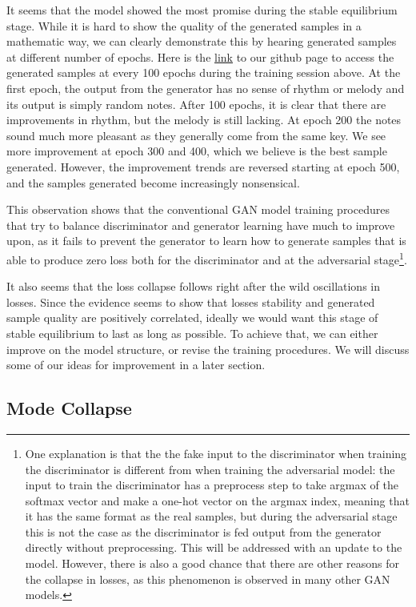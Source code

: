 \documentclass[12pt,oneside]{chicagocapstone}
\begin{document}
It seems that the model showed the most promise during the stable equilibrium stage. While it is hard to show the quality of the generated samples in a mathematic way, we can clearly demonstrate this by hearing generated samples at different number of epochs. Here is the \href{https://github.com/terrywang15/museG_dev/tree/master/2020-01-31\%2002-20}{link} to our github page to access the generated samples at every 100 epochs during the training session above. At the first epoch, the output from the generator has no sense of rhythm or melody and its output is simply random notes. After 100 epochs, it is clear that there are improvements in rhythm, but the melody is still lacking. At epoch 200 the notes sound much more pleasant as they generally come from the same key. We see more improvement at epoch 300 and 400, which we believe is the best sample generated. However, the improvement trends are reversed starting at epoch 500, and the samples generated become increasingly nonsensical.

This observation shows that the conventional GAN model training procedures that try to balance discriminator and generator learning have much to improve upon, as it fails to prevent the generator to learn how to generate samples that is able to produce zero loss both for the discriminator and at the adversarial stage\footnote{One explanation is that the the fake input to the discriminator when training the discriminator is different from when training the adversarial model: the input to train the discriminator has a preprocess step to take argmax of the softmax vector and make a one-hot vector on the argmax index, meaning that it has the same format as the real samples, but during the adversarial stage this is not the case as the discriminator is fed output from the generator directly without preprocessing. This will be addressed with an update to the model. However, there is also a good chance that there are other reasons for the collapse in losses, as this phenomenon is observed in many other GAN models.}.

It also seems that the loss collapse follows right after the wild oscillations in losses. Since the evidence seems to show that losses stability and generated sample quality are positively correlated, ideally we would want this stage of stable equilibrium to last as long as possible. To achieve that, we can either improve on the model structure, or revise the training procedures. We will discuss some of our ideas for improvement in a later section.

\hypertarget{mode-collapse}{%
\subsection*{Mode Collapse}\label{mode-collapse}}
\end{document}
